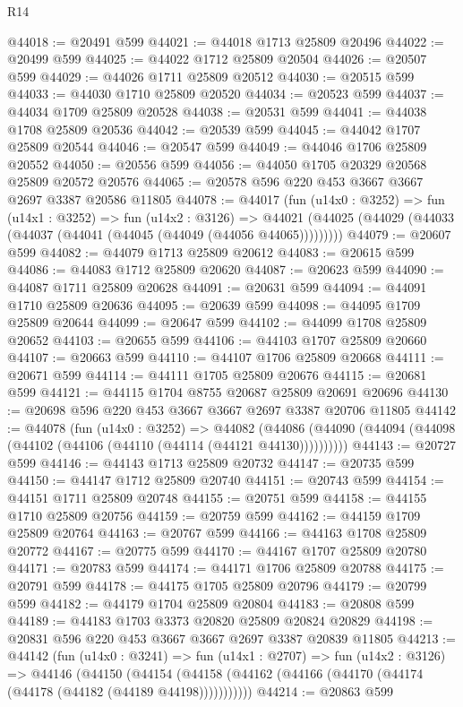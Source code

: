 \begin{lexlean}{R14}
\begin{coremodule}
@44018 := @20491 @599
@44021 := @44018 @1713 @25809 @20496
@44022 := @20499 @599
@44025 := @44022 @1712 @25809 @20504
@44026 := @20507 @599
@44029 := @44026 @1711 @25809 @20512
@44030 := @20515 @599
@44033 := @44030 @1710 @25809 @20520
@44034 := @20523 @599
@44037 := @44034 @1709 @25809 @20528
@44038 := @20531 @599
@44041 := @44038 @1708 @25809 @20536
@44042 := @20539 @599
@44045 := @44042 @1707 @25809 @20544
@44046 := @20547 @599
@44049 := @44046 @1706 @25809 @20552
@44050 := @20556 @599
@44056 := @44050 @1705 @20329 @20568 @25809 @20572 @20576
@44065 := @20578 @596 @220 @453 @3667 @3667 @2697 @3387 @20586 @11805
@44078 := @44017
    (fun (u14x0 : @3252) =>
    fun (u14x1 : @3252) =>
    fun (u14x2 : @3126) =>
    @44021 (@44025 (@44029 (@44033 (@44037 (@44041 (@44045 (@44049 (@44056 @44065)))))))))
@44079 := @20607 @599
@44082 := @44079 @1713 @25809 @20612
@44083 := @20615 @599
@44086 := @44083 @1712 @25809 @20620
@44087 := @20623 @599
@44090 := @44087 @1711 @25809 @20628
@44091 := @20631 @599
@44094 := @44091 @1710 @25809 @20636
@44095 := @20639 @599
@44098 := @44095 @1709 @25809 @20644
@44099 := @20647 @599
@44102 := @44099 @1708 @25809 @20652
@44103 := @20655 @599
@44106 := @44103 @1707 @25809 @20660
@44107 := @20663 @599
@44110 := @44107 @1706 @25809 @20668
@44111 := @20671 @599
@44114 := @44111 @1705 @25809 @20676
@44115 := @20681 @599
@44121 := @44115 @1704 @8755 @20687 @25809 @20691 @20696
@44130 := @20698 @596 @220 @453 @3667 @3667 @2697 @3387 @20706 @11805
@44142 := @44078
    (fun (u14x0 : @3252) =>
    @44082 (@44086 (@44090 (@44094 (@44098 (@44102 (@44106 (@44110 (@44114 (@44121 @44130))))))))))
@44143 := @20727 @599
@44146 := @44143 @1713 @25809 @20732
@44147 := @20735 @599
@44150 := @44147 @1712 @25809 @20740
@44151 := @20743 @599
@44154 := @44151 @1711 @25809 @20748
@44155 := @20751 @599
@44158 := @44155 @1710 @25809 @20756
@44159 := @20759 @599
@44162 := @44159 @1709 @25809 @20764
@44163 := @20767 @599
@44166 := @44163 @1708 @25809 @20772
@44167 := @20775 @599
@44170 := @44167 @1707 @25809 @20780
@44171 := @20783 @599
@44174 := @44171 @1706 @25809 @20788
@44175 := @20791 @599
@44178 := @44175 @1705 @25809 @20796
@44179 := @20799 @599
@44182 := @44179 @1704 @25809 @20804
@44183 := @20808 @599
@44189 := @44183 @1703 @3373 @20820 @25809 @20824 @20829
@44198 := @20831 @596 @220 @453 @3667 @3667 @2697 @3387 @20839 @11805
@44213 := @44142
    (fun (u14x0 : @3241) =>
    fun (u14x1 : @2707) =>
    fun (u14x2 : @3126) =>
    @44146
      (@44150
        (@44154 (@44158 (@44162 (@44166 (@44170 (@44174 (@44178 (@44182 (@44189 @44198)))))))))))
@44214 := @20863 @599

\end{coremodule}
\end{lexlean}
